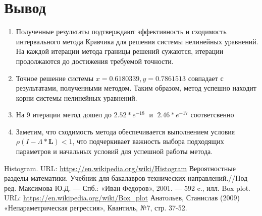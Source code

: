\documentclass[a4paper,14pt]{article}
\begin{document}
	\section{Вывод}
	\begin{enumerate}
		\item Полученные результаты подтверждают эффективность и сходимость интервального метода Кравчика для решения системы нелинейных уравнений. На каждой итерации метода границы решений сужаются, итерации продолжаются до достижения требуемой точности.
		\item Точное решение системы $x = 0.6180339, y = 0.7861513$ совпадает с результатами, полученными методом. Таким образом, метод успешно находит корни системы нелинейных уравнений.
		\item На 9 итерации метод дошел до  $2.52*e^{-18}\; $ и $\; 2.46*e^{-17}$ соответсвенно
		\item Заметим, что сходимость метода обеспечивается выполнением условия $\rho(I-\Lambda*\textbf{L})<1$, что подчеркивает важность выбора подходящих параметров и начальных условий для успешной работы метода.
	\end{enumerate}
	
	\newpage
	
	\begin{thebibliography}{4}
		Histogram. URL: \url{https://en.wikipedia.org/wiki/Histogram}
		Вероятностные разделы математики. Учебник для бакалавров технических направлений.//Под ред. Максимова Ю.Д. --- Спб.: «Иван Федоров», 2001. --- 592 c., илл.
		Box plot. URL: \url{https://en.wikipedia.org/wiki/Box_plot}
		Анатольев, Станислав (2009) «Непараметрическая регрессия», Квантиль, №7, стр. 37-52.
	\end{thebibliography}
	
\end{document}
